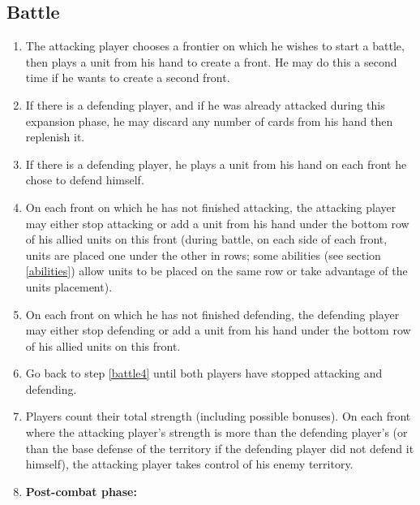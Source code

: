 \documentclass[a4paper]{article}
\begin{document}
    \subsection{Battle}
        \label{battle}
        \begin{enumerate}
            \item The attacking player chooses a frontier on which he wishes to start
                a battle, then plays a unit from his hand to create a front.
                He may do this a second time if he wants to create a second front.
            \item If there is a defending player,
                and if he was already attacked during this expansion phase,
                he may discard any number of cards from his hand then replenish it.
            \item If there is a defending player,
                he plays a unit from his hand on each front he chose to defend himself.
            \item On each front on which he has not finished attacking,
                the attacking player may either stop attacking or add a unit
                from his hand under the bottom row of his allied units on this front
                (during battle, on each side of each front,
                units are placed one under the other in rows; 
                some abilities (see section \ref{abilities}) allow units to be placed
                on the same row or take advantage of the units placement).
                \label{battle4}
            \item On each front on which he has not finished defending,
                the defending player may either stop defending or add a unit
                from his hand under the bottom row of his allied units on this front.
            \item Go back to step \ref{battle4} until both players have stopped
                attacking and defending.
                \label{battle5}
            \item Players count their total strength (including possible bonuses).
                On each front where the attacking player's strength is more than
                the defending player's (or than the base defense of the territory
                if the defending player did not defend it himself),
                the attacking player takes control of his enemy territory.
            \item \textbf{Post-combat phase:}\\

\end{enumerate}
\end{document}
